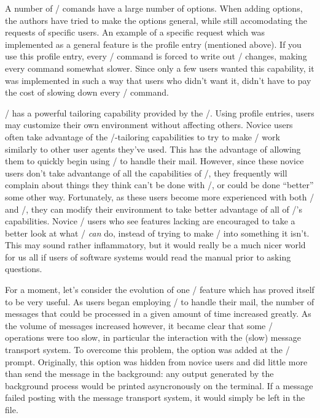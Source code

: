 A number of \MH/ comands have a large number of options.
When adding options, the authors have tried to make the options
general, while still accomodating the requests of specific users.
An example of a specific request which was implemented as a
general feature is the  profile entry
(mentioned above).
If you use this profile entry, every \MH/ command is forced to write
out \context/ changes, making every command somewhat slower.
Since only a few users wanted this capability, it was implemented
in such a way that users who didn't want it, didn't have to pay
the cost of slowing down every \MH/ command.

\MH/ has a powerful tailoring capability provided by the \profile/.
Using profile entries, users may
customize their own environment without affecting others.
Novice users often take advantage of the \MH/-tailoring
capabilities to try to make \MH/ work similarly to
other user agents they've used.
This has the advantage of allowing them to quickly begin
using \MH/ to handle their mail.
However, since these novice users don't take advantange of all the
capabilities of \MH/,
they frequently will complain about things they think can't
be done with \MH/, or could be done ``better'' some other way.
Fortunately,
as these users become more experienced with both \MH/ and \unix/,
they can modify their environment to take better advantage of
all of \MH/'s capabilities.
Novice \MH/ users who see features lacking
are encouraged to take a better look at what \MH/ {\it can} do,
instead of trying to make \MH/ into something it isn't.
This may sound rather inflammatory,
but it would really be a much nicer world for us all if users of software
systems would read the manual prior to asking questions.

For a moment, let's consider the evolution of one \MH/ feature which has
proved itself to be very useful.
As users began employing \MH/ to handle their mail,
the number of messages that could be processed
in a given amount of time increased greatly.
As the volume of messages increased however,
it became clear that some \MH/ operations were too slow,
in particular the interaction with the (slow) message transport system.
To overcome this problem, the  option
was added at the \whatnow/ prompt.
Originally, this option was hidden from novice users
and did little more than send the message in the background:
any output generated by
the background  process would be printed
asyncronously on the terminal.
If a message failed posting with the message transport system,
it would simply be left in the  file.

